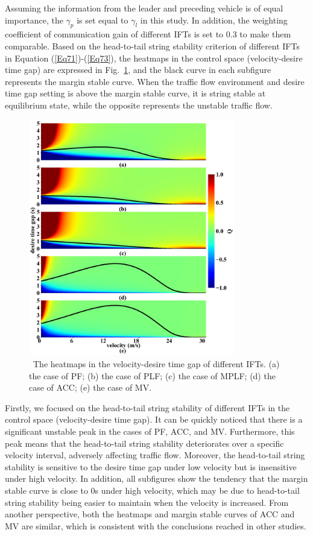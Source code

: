 \documentclass[journal]{IEEEtran}
\begin{document}
Assuming the information from the leader and preceding vehicle is of equal importance, the $\gamma_p$ is set equal to $\gamma_l$ in this study. In addition, the weighting coefficient of communication gain of different IFTs is set to 0.3 to make them comparable. Based on the head-to-tail string stability criterion of different IFTs in Equation (\ref{Eq71})-(\ref{Eq73}), the heatmaps in the control space (velocity-desire time gap) are expressed in Fig.~\ref{Figure3}, and the black curve in each subfigure represents the margin stable curve. When the traffic flow environment and desire time gap setting is above the margin stable curve, it is string stable at equilibrium state, while the opposite represents the unstable traffic flow.

\begin{figure}
  \centering
  \includegraphics[width=9cm]{fig3.png}
  \caption{~The heatmaps in the velocity-desire time gap of different IFTs. (a) the case of PF; (b) the case of PLF; (c) the case of MPLF; (d) the case of ACC; (e) the case of MV.}
  \label{Figure3}
\end{figure}

Firstly, we focused on the head-to-tail string stability of different IFTs in the control space (velocity-desire time gap). It can be quickly noticed that there is a significant unstable peak in the cases of PF, ACC, and MV. Furthermore, this peak means that the head-to-tail string stability deteriorates over a specific velocity interval, adversely affecting traffic flow. Moreover, the head-to-tail string stability is sensitive to the desire time gap under low velocity but is insensitive under high velocity. In addition, all subfigures show the tendency that the margin stable curve is close to 0s under high velocity, which may be due to head-to-tail string stability being easier to maintain when the velocity is increased. From another perspective, both the heatmaps and margin stable curves of ACC and MV are similar, which is consistent with the conclusions reached in other studies.
\end{document}
